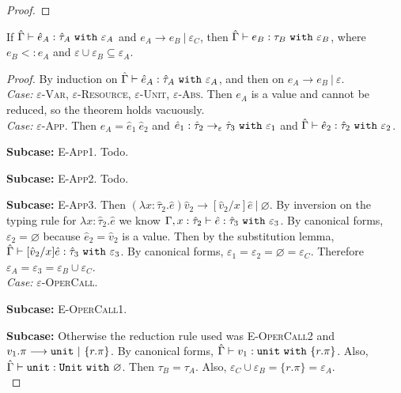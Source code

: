 \begin{appendix}
\begin{proof}
\end{proof}

\hrulefill

\begin{theorem}[Preservation]
If $\hat \Gamma \vdash \hat e_A: \hat \tau_A~\mathtt{with}~ \varepsilon_A$ and $e_A \longrightarrow e_B~|~\varepsilon_C$, then $\hat \Gamma \vdash e_B: \tau_B~\mathtt{with}~ \varepsilon_B$, where $e_B <: e_A$ and $\varepsilon \cup \varepsilon_B \subseteq \varepsilon_A$.
\end{theorem}

\begin{proof}
By induction on $\hat \Gamma \vdash \hat e_A: \hat \tau_A~\mathtt{with}~ \varepsilon_A$, and then on $e_A \longrightarrow e_B~|~\varepsilon$. \\

\textit{Case:} \textsc{$\varepsilon$-Var}, \textsc{$\varepsilon$-Resource}, \textsc{$\varepsilon$-Unit}, \textsc{$\varepsilon$-Abs}. Then $e_A$ is a value and cannot be reduced, so the theorem holds vacuously. \\

\textit{Case:} \textsc{$\varepsilon$-App}. Then $e_A = \hat e_1~\hat e_2$ and $\hat e_1: \hat \tau_2 \rightarrow_{\varepsilon} \hat \tau_3~\mathtt{with}~ \varepsilon_1$ and $\hat \Gamma \vdash \hat e_2: \hat \tau_2~\mathtt{with}~ \varepsilon_2$.

\textbf{Subcase:} \textsc{E-App1}. Todo.

\textbf{Subcase:} \textsc{E-App2}. Todo.

\textbf{Subcase:} \textsc{E-App3}. Then $(\lambda x: \hat \tau_2.\hat e)\hat v_2 \longrightarrow [\hat v_2/x]\hat e~|~\varnothing$. By inversion on the typing rule for $\lambda x: \hat \tau_2.\hat e$ we know $\Gamma, x: \hat \tau_2 \vdash \hat e: \hat \tau_3~\mathtt{with}~ \varepsilon_3$. By canonical forms, $\varepsilon_2 = \varnothing$ because $\hat e_2 = \hat v_2$ is a value. Then by the substitution lemma, $\hat \Gamma \vdash [\hat v_2/x]\hat e : \hat \tau_3~\mathtt{with}~ \varepsilon_3$. By canonical forms, $\varepsilon_1 = \varepsilon_2 = \varnothing = \varepsilon_C$. Therefore $\varepsilon_A = \varepsilon_3 = \varepsilon_B \cup \varepsilon_C$. \\

\textit{Case:}  \textsc{$\varepsilon$-OperCall}. 

\textbf{Subcase:} \textsc{E-OperCall1}.

\textbf{Subcase:} Otherwise the reduction rule used was \textsc{E-OperCall2} and $v_1.\pi \longrightarrow \mathtt{unit}~|~\{ r.\pi \}$. By canonical forms, $\hat \Gamma \vdash v_1: \mathtt{unit}~\mathtt{with}~ \{ r.\pi \}$. Also, $\hat \Gamma \vdash \mathtt{unit}: \mathtt{Unit}~\mathtt{with}~ \varnothing$. Then $\tau_B = \tau_A$. Also, $\varepsilon_C \cup \varepsilon_B = \{ r.\pi \} = \varepsilon_A$. \\


\end{proof}
\end{appendix}
